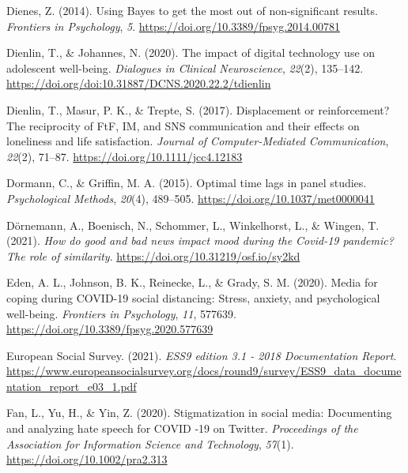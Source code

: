 \documentclass[
  man,mask,floatsintext]{apa7}
\newlength{\cslhangindent}
\newlength{\cslentryspacingunit} %
\newenvironment{CSLReferences}[2] %
 {%
  \setlength{\parindent}{0pt}
  \ifodd #1
  \let\oldpar\par
  \def\par{\hangindent=\cslhangindent\oldpar}
  \fi
  \setlength{\parskip}{#2\cslentryspacingunit}
 }%
 {}
\begin{document}
\begin{CSLReferences}{1}{0}
\leavevmode{}%
Dienes, Z. (2014). Using {Bayes} to get the most out of non-significant results. \emph{Frontiers in Psychology}, \emph{5}. \url{https://doi.org/10.3389/fpsyg.2014.00781}

\leavevmode{}%
Dienlin, T., \& Johannes, N. (2020). The impact of digital technology use on adolescent well-being. \emph{Dialogues in Clinical Neuroscience}, \emph{22}(2), 135--142. \url{https://doi.org/doi:10.31887/DCNS.2020.22.2/tdienlin}

\leavevmode{}%
Dienlin, T., Masur, P. K., \& Trepte, S. (2017). Displacement or reinforcement? {The} reciprocity of {FtF}, {IM}, and {SNS} communication and their effects on loneliness and life satisfaction. \emph{Journal of Computer-Mediated Communication}, \emph{22}(2), 71--87. \url{https://doi.org/10.1111/jcc4.12183}

\leavevmode{}%
Dormann, C., \& Griffin, M. A. (2015). Optimal time lags in panel studies. \emph{Psychological Methods}, \emph{20}(4), 489--505. \url{https://doi.org/10.1037/met0000041}

\leavevmode{}%
Dörnemann, A., Boenisch, N., Schommer, L., Winkelhorst, L., \& Wingen, T. (2021). \emph{How do good and bad news impact mood during the {Covid-19} pandemic? {The} role of similarity}. \url{https://doi.org/10.31219/osf.io/sy2kd}

\leavevmode{}%
Eden, A. L., Johnson, B. K., Reinecke, L., \& Grady, S. M. (2020). Media for coping during {COVID-19} social distancing: {Stress}, anxiety, and psychological well-being. \emph{Frontiers in Psychology}, \emph{11}, 577639. \url{https://doi.org/10.3389/fpsyg.2020.577639}

\leavevmode{}%
European Social Survey. (2021). \emph{{ESS9} edition 3.1 - 2018 {Documentation Report}}. \url{https://www.europeansocialsurvey.org/docs/round9/survey/ESS9_data_documentation_report_e03_1.pdf}

\leavevmode{}%
Fan, L., Yu, H., \& Yin, Z. (2020). Stigmatization in social media: {Documenting} and analyzing hate speech for {\textsc{COVID}} ‐19 on {Twitter}. \emph{Proceedings of the Association for Information Science and Technology}, \emph{57}(1). \url{https://doi.org/10.1002/pra2.313}


\end{CSLReferences}
\end{document}

